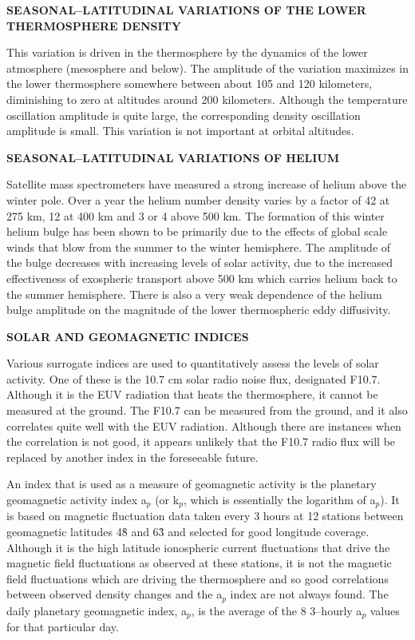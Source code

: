 \textbf{SEASONAL--LATITUDINAL VARIATIONS OF THE LOWER THERMOSPHERE
DENSITY}

This variation is driven in the thermosphere by the dynamics of the lower
atmosphere (mesosphere and below).  The amplitude of the variation maximizes
in the lower thermosphere somewhere between about 105 and 120 kilometers,
diminishing to zero at altitudes around 200 kilometers.  Although the
temperature oscillation amplitude is quite large, the corresponding density
oscillation amplitude is small.  This variation is not important at orbital
altitudes.

\textbf{SEASONAL--LATITUDINAL VARIATIONS OF HELIUM}

Satellite mass spectrometers have measured a strong increase of helium above
the winter pole. Over a year the helium number density varies by a factor of
42 at 275 km, 12 at 400 km and 3 or 4 above 500 km.  The formation of this
winter helium bulge has been shown to be primarily due to the effects of
global scale winds that blow from the summer to the winter hemisphere.  The
amplitude of the bulge decreases with increasing levels of solar activity,
due to the increased effectiveness of exospheric transport above 500 km
which carries helium back to the summer hemisphere.  There is also a very
weak dependence of the helium bulge amplitude on the magnitude of the lower
thermospheric eddy diffusivity.

\textbf{SOLAR AND GEOMAGNETIC INDICES}

Various surrogate indices are used to quantitatively assess the levels of
solar activity. One of these is the 10.7 cm solar radio noise flux,
designated F10.7.  Although it is the EUV radiation that heats the
thermosphere, it cannot be measured at the ground.  The F10.7 can be measured
from the ground, and it also correlates quite well with the EUV radiation.
Although there are instances when the correlation is not good, it appears
unlikely that the F10.7 radio flux will be replaced by another index in
the foreseeable future.

An index that is used as a measure of geomagnetic activity is the planetary
geomagnetic activity index a$_{p}$ (or k$_{p}$, which is essentially the
logarithm of a$_{p}$).  It is based on magnetic fluctuation data taken every
3 hours at 12 stations between geomagnetic latitudes 48\r{ } and 63\r{ } and
selected for good longitude coverage.  Although it is the high latitude
ionospheric current fluctuations that drive the magnetic field fluctuations
as observed at these stations, it is not the magnetic field fluctuations
which are driving the thermosphere and so good correlations between observed
density changes and the a$_{p}$ index are not always found.  The daily
planetary geomagnetic index, a$_{p}$, is the average of the
8 3--hourly a$_{p}$ values for that particular day.

